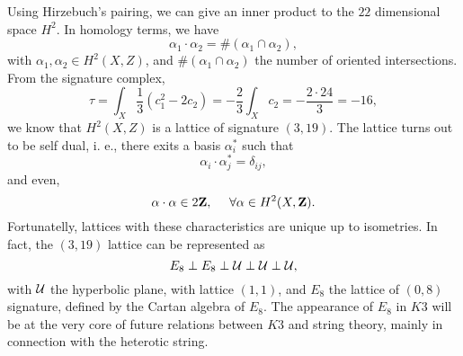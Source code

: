 Using Hirzebuch's pairing, we can give an inner product to the
$22$ dimensional space $H^2$. In homology terms, we have
\begin{equation}
\alpha_1 \cdot \alpha_2 = \# (\alpha_1 \cap \alpha_2),
\label{eq:b11}
\end{equation}
with $\alpha_1, \alpha_2 \in H^2(X,Z)$, and $\#(\alpha_1 \cap
\alpha_2)$ the number of oriented intersections. From the
signature complex,
\begin{equation}
\tau = \int_X \frac {1}{3} (c_1^2-2c_2) = - \frac {2}{3} \int_X
c_2 = - \frac {2\cdot24}{3} = -16, 
\label{eq:b12}
\end{equation}
we know that $H^2(X,Z)$ is a lattice of signature $(3,19)$. The
lattice turns out to be self dual, i. e., there exits a basis
$\alpha_i^*$ such that 
\begin{equation}
\alpha_i \cdot \alpha_j^* = \delta_{ij},
\label{eq:b13}
\end{equation}
and even,
\begin{equation}
\alpha \cdot \alpha \in 2 {\bf Z}, \: \: \: \: \: \: \forall
\alpha \in H^2(X,{\bf Z}).
\label{eq:b14}
\end{equation}
Fortunatelly, lattices with these characteristics are unique up
to isometries. In fact, the $(3,19)$ lattice can be represented
as
\begin{equation}
E_8 \perp E_8 \perp {\cal U} \perp {\cal U} \perp {\cal U},
\label{eq:b15}
\end{equation}
with ${\cal U}$ the hyperbolic plane, with lattice $(1,1)$, and
$E_8$ the lattice of $(0,8)$ signature, defined by the Cartan
algebra of $E_8$. The appearance of $E_8$ in $K3$ will be at the
very core of future relations between $K3$ and string theory,
mainly in connection with the heterotic string.
  
